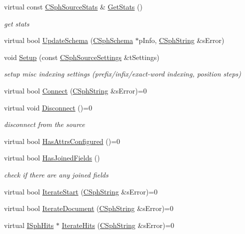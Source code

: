 \begin{DoxyCompactItemize}
virtual const \hyperlink{structCSphSourceStats}{C\-Sph\-Source\-Stats} \& \hyperlink{classCSphSource_a051c9f5b12cece4e86106225987d217a}{Get\-Stats} ()
\begin{DoxyCompactList}\small\item\em get stats \end{DoxyCompactList}\item 
virtual bool \hyperlink{classCSphSource_a082c964ed9c6ffa34ffac69b29810f24}{Update\-Schema} (\hyperlink{classCSphSchema}{C\-Sph\-Schema} $\ast$p\-Info, \hyperlink{structCSphString}{C\-Sph\-String} \&s\-Error)
\item 
void \hyperlink{classCSphSource_ab1c4e1f6cb14d7301a37b9ccf9efa0a2}{Setup} (const \hyperlink{structCSphSourceSettings}{C\-Sph\-Source\-Settings} \&t\-Settings)
\begin{DoxyCompactList}\small\item\em setup misc indexing settings (prefix/infix/exact-\/word indexing, position steps) \end{DoxyCompactList}\item 
virtual bool \hyperlink{classCSphSource_a50f73194db9b7580d03b877fad183d1d}{Connect} (\hyperlink{structCSphString}{C\-Sph\-String} \&s\-Error)=0
\item 
virtual void \hyperlink{classCSphSource_ae8fb8afc3854b68c2b9f69421e2ba759}{Disconnect} ()=0
\begin{DoxyCompactList}\small\item\em disconnect from the source \end{DoxyCompactList}\item 
virtual bool \hyperlink{classCSphSource_a18a23aba5b933c8ed3c84d3fa360ac3b}{Has\-Attrs\-Configured} ()=0
\item 
virtual bool \hyperlink{classCSphSource_ae1d74fa79667e6952fdd905e581b70fc}{Has\-Joined\-Fields} ()
\begin{DoxyCompactList}\small\item\em check if there are any joined fields \end{DoxyCompactList}\item 
virtual bool \hyperlink{classCSphSource_a290f2ae8fbc60b2def57305ee08b0d3f}{Iterate\-Start} (\hyperlink{structCSphString}{C\-Sph\-String} \&s\-Error)=0
\item 
virtual bool \hyperlink{classCSphSource_a9538a6f16bbb38bfa8d78516d10923fe}{Iterate\-Document} (\hyperlink{structCSphString}{C\-Sph\-String} \&s\-Error)=0
\item 
virtual \hyperlink{classISphHits}{I\-Sph\-Hits} $\ast$ \hyperlink{classCSphSource_a06776f779e04709b3980421e00332dd8}{Iterate\-Hits} (\hyperlink{structCSphString}{C\-Sph\-String} \&s\-Error)=0

\end{DoxyCompactItemize}
